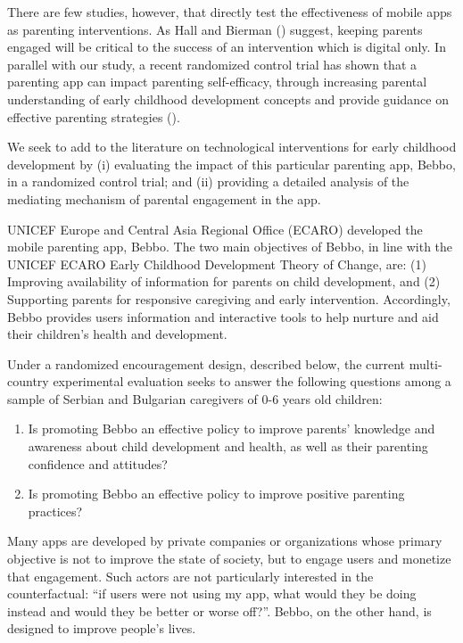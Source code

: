 There are few studies, however, that directly test the effectiveness of mobile apps as parenting interventions. As Hall and Bierman (\parencite*{Hall2015}) suggest, keeping parents engaged will be critical to the success of an intervention which is digital only. In parallel with our study, a recent randomized control trial has shown that a parenting app can impact parenting self-efficacy, through increasing parental understanding of early childhood development concepts and provide guidance on effective parenting strategies (\cite{Outhwaite2023}).

We seek to add to the literature on technological interventions for early childhood development by (i) evaluating the impact of this particular parenting app, Bebbo, in a randomized control trial; and (ii) providing a detailed analysis of the mediating mechanism of parental engagement in the app.

UNICEF Europe and Central Asia Regional Office (ECARO) developed the mobile parenting app, Bebbo. The two main objectives of Bebbo, in line with the UNICEF ECARO Early Childhood Development Theory of Change, are: (1) Improving availability of information for parents on child development, and (2) Supporting parents for responsive caregiving and early intervention. Accordingly, Bebbo provides users information and interactive tools to help nurture and aid their children’s health and development.

Under a randomized encouragement design, described below, the current multi-country experimental evaluation seeks to answer the following questions among a sample of Serbian and Bulgarian caregivers of 0-6 years old children:

\begin{enumerate}
\item Is promoting Bebbo an effective policy to improve parents’ knowledge and awareness about child development and health, as well as their parenting confidence and attitudes?
\item Is promoting Bebbo an effective policy to  improve positive parenting practices?
\end{enumerate}

Many apps are developed by private companies or organizations whose primary objective is not to improve the state of society, but to engage users and monetize that engagement. Such actors are not particularly interested in the counterfactual: “if users were not using my app, what would they be doing instead and would they be better or worse off?”. Bebbo, on the other hand, is designed to improve people’s lives.

